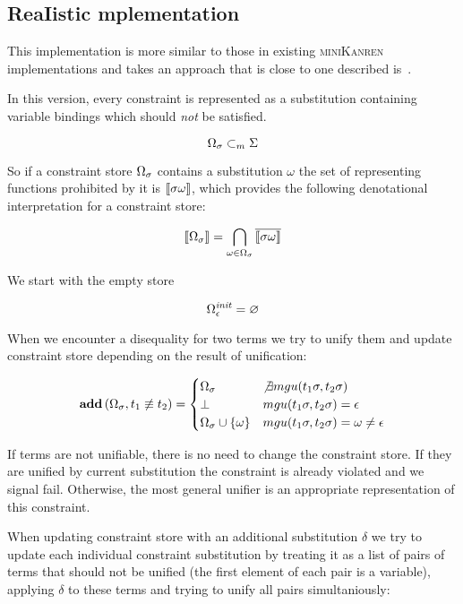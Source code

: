 \subsection{ReaIistic mplementation}

This implementation is more similar to those in existing \textsc{miniKanren} implementations and takes an approach that is close to one described is~\cite{CKanren}.

In this version, every constraint is represented as a substitution containing variable bindings which should \emph{not} be satisfied.

\[ \Omega_\sigma \subset_m \Sigma \]

So if a constraint store $\Omega_\sigma$ contains a substitution $\omega$ the set of representing functions prohibited by it is $\llbracket{\sigma \omega}\rrbracket$,
which provides the following denotational interpretation for a constraint store:

\[ \llbracket{\Omega_\sigma}\rrbracket = \bigcap_{\omega \in \Omega_\sigma} \overline{ \llbracket{\sigma \omega}\rrbracket } \]

We start with the empty store

\[ \Omega_\epsilon^{\mathit{init}} = \varnothing \]

When we encounter a disequality for two terms we try to unify them and update constraint store depending on the result of unification:

\[
\mathbf{add}\,(\Omega_\sigma, t_1 \not\equiv t_2) =
    \begin{cases}
       \Omega_\sigma                                & \not\exists mgu(t_1 \sigma, t_2 \sigma) \\
       \bot                                                 & mgu(t_1 \sigma, t_2 \sigma) = \epsilon \\
       \Omega_\sigma \cup \{\omega\}      & mgu(t_1 \sigma, t_2 \sigma) = \omega \neq \epsilon
    \end{cases}
\]

If terms are not unifiable, there is no need to change the constraint store. If they are unified by current substitution the constraint is already violated and we signal fail.
Otherwise, the most general unifier is an appropriate representation of this constraint.

When updating constraint store with an additional substitution $\delta$ we try to update each individual constraint substitution by treating it
as a list of pairs of terms that should not be unified (the first element of each pair is a variable), applying $\delta$ to these terms and trying to
unify all pairs simultaniously:

